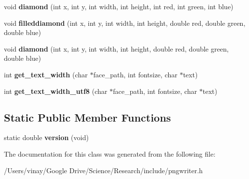 \begin{DoxyCompactItemize}
\item 
\hypertarget{classpngwriter_a55831478df5f12bcadab9f250376456b}{}void {\bfseries diamond} (int x, int y, int width, int height, int red, int green, int blue)\label{classpngwriter_a55831478df5f12bcadab9f250376456b}

\item 
\hypertarget{classpngwriter_a2b926975049c8c5f7140c5568c82af4c}{}void {\bfseries filleddiamond} (int x, int y, int width, int height, double red, double green, double blue)\label{classpngwriter_a2b926975049c8c5f7140c5568c82af4c}

\item 
\hypertarget{classpngwriter_a749896b99dac3872087d5316727edf88}{}void {\bfseries diamond} (int x, int y, int width, int height, double red, double green, double blue)\label{classpngwriter_a749896b99dac3872087d5316727edf88}

\item 
\hypertarget{classpngwriter_a6148026b1ff1ca92a27d47ef172c2fe9}{}int {\bfseries get\+\_\+text\+\_\+width} (char $\ast$face\+\_\+path, int fontsize, char $\ast$text)\label{classpngwriter_a6148026b1ff1ca92a27d47ef172c2fe9}

\item 
\hypertarget{classpngwriter_a1c98d77883342c62ab78643f49a2c093}{}int {\bfseries get\+\_\+text\+\_\+width\+\_\+utf8} (char $\ast$face\+\_\+path, int fontsize, char $\ast$text)\label{classpngwriter_a1c98d77883342c62ab78643f49a2c093}

\end{DoxyCompactItemize}
\subsection*{Static Public Member Functions}
\begin{DoxyCompactItemize}
\item 
\hypertarget{classpngwriter_a4dfca16a9c5ed6492204ce9e6f258a8a}{}static double {\bfseries version} (void)\label{classpngwriter_a4dfca16a9c5ed6492204ce9e6f258a8a}

\end{DoxyCompactItemize}


The documentation for this class was generated from the following file\+:\begin{DoxyCompactItemize}
\item 
/\+Users/vinay/\+Google Drive/\+Science/\+Research/include/pngwriter.\+h\end{DoxyCompactItemize}
